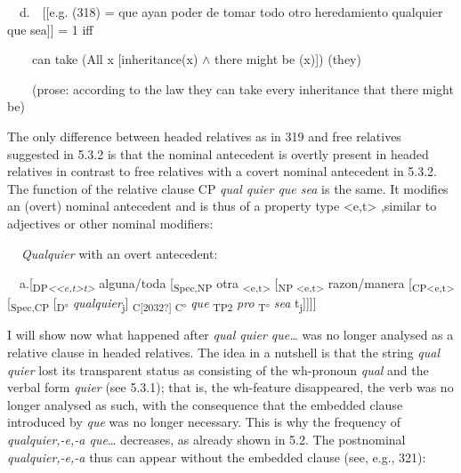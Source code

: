 \begin{styleStandard}
\ \ d.\ \ [[e.g. (318) = que ayan poder de tomar todo otro heredamiento qualquier que sea]] = 1 iff\ \ 
\end{styleStandard}

\begin{styleStandard}
\ \ \ \ can take (All x [inheritance(x) ${\wedge}$ there might be (x)]) (they)\ \ 
\end{styleStandard}

\begin{styleStandard}
\ \ \ \ (prose: according to the law they can take every inheritance that there might be)
\end{styleStandard}

\begin{styleStandard}
The only difference between headed relatives as in 319 and free relatives suggested in 5.3.2 is that the nominal antecedent is overtly present in headed relatives in contrast to free relatives with a covert nominal antecedent in 5.3.2. The function of the relative clause CP \textit{qual quier que sea }is the same. It modifies an (overt) nominal antecedent and is thus of a property type {\textless}e,t{\textgreater} ,similar to adjectives or other nominal modifiers: 
\end{styleStandard}

\begin{styleStandard}
\textbf{\ \ }\textit{Qualquier} with an overt antecedent:
\end{styleStandard}

\begin{styleStandard}
\ \ a.[\textsubscript{DP}\textit{\textsubscript{{\textless}{\textless}e,t{\textgreater}t{\textgreater}}} alguna/toda [\textsubscript{Spec,NP} otra \textsubscript{{\textless}e,t{\textgreater}} [\textsubscript{NP {\textless}e,t{\textgreater}} razon/manera [\textsubscript{CP{\textless}e,t{\textgreater}} [\textsubscript{Spec,CP} [\textsubscript{D°} \textit{qualquier}\textsubscript{j}] \textsubscript{C[2032?] C°} \textit{que} \textsubscript{TP2} \textit{pro}\textit{\textsubscript{ }}\textsubscript{T°} \textit{sea} t\textsubscript{j}]]]]
\end{styleStandard}

\begin{styleStandard}
\end{styleStandard}

\begin{styleStandard}
I will show now what happened after \textit{qual quier que… }was no longer analysed as a relative clause in headed relatives. The idea in a nutshell is that the string \textit{qual quier }lost its transparent status as consisting of the wh-pronoun \textit{qual} and the verbal form \textit{quier} (see 5.3.1); that is, the wh-feature disappeared, the verb was no longer analysed as such, with the consequence that the embedded clause introduced by \textit{que} was no longer necessary. This is why the frequency of \textit{qualquier,-e,-a que}… decreases, as already shown in 5.2. The postnominal \textit{qualquier,-e,-a} thus can appear without the embedded clause (see, e.g., 321):
\end{styleStandard}

